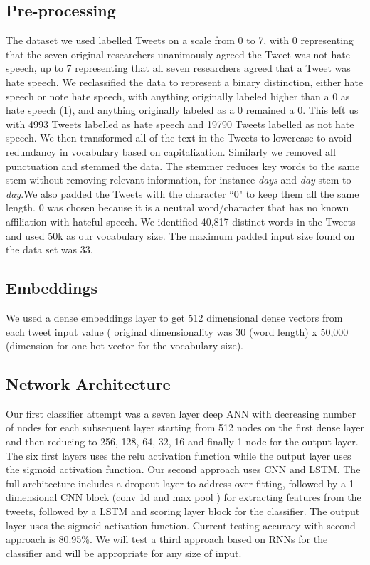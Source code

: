 \documentclass[conference]{sig-alternate-05-2015}
\begin{document}
\subsection{Pre-processing}
The dataset we used labelled Tweets on a scale from 0 to 7, with 0 representing that the seven original researchers unanimously agreed the Tweet was not hate speech, up to 7 representing that all seven researchers agreed that a Tweet was hate speech. We reclassified the data to represent a binary distinction, either hate speech or note hate speech, with anything originally labeled higher than a 0 as hate speech (1), and anything originally labeled as a 0 remained a 0. This left us with 4993 Tweets labelled as hate speech and 19790 Tweets labelled as not hate speech. We then transformed all of the text in the Tweets to lowercase to avoid redundancy in vocabulary based on capitalization. Similarly we removed all punctuation and stemmed the data. The stemmer reduces key words to the same stem without removing relevant information, for instance \textit{days} and \textit{day} stem to \textit{day}.We also padded the Tweets with the character ``0" to keep them all the same length. 0 was chosen because it is a neutral word/character that has no known affiliation with hateful speech.
We identified 40,817 distinct words in the Tweets and used 50k as our vocabulary size. 
The maximum padded input size found on the data set was 33. 

\subsection{Embeddings}
We used a dense embeddings layer to get 512 dimensional dense vectors from each tweet input value ( original dimensionality was 30 (word length) x 50,000 (dimension for one-hot vector for the vocabulary size). 

\subsection{Network Architecture}
Our first classifier attempt was a seven layer deep ANN with decreasing number of nodes for each subsequent layer starting from 512 nodes on the first dense layer and then reducing to 256, 128, 64, 32, 16 and finally 1 node for the output layer. The six first layers uses the relu activation function while the output layer uses the sigmoid activation function. 
Our second approach uses CNN and LSTM. The full architecture includes a dropout layer to address over-fitting, followed by a 1 dimensional CNN block (conv 1d and max pool ) for extracting features from the tweets, followed by a LSTM and scoring layer block for the classifier. The output layer uses the sigmoid activation function. Current testing accuracy with second approach is 80.95\%. 
We will test a third approach based on RNNs for the classifier and will be appropriate for any size of input.
\end{document}
